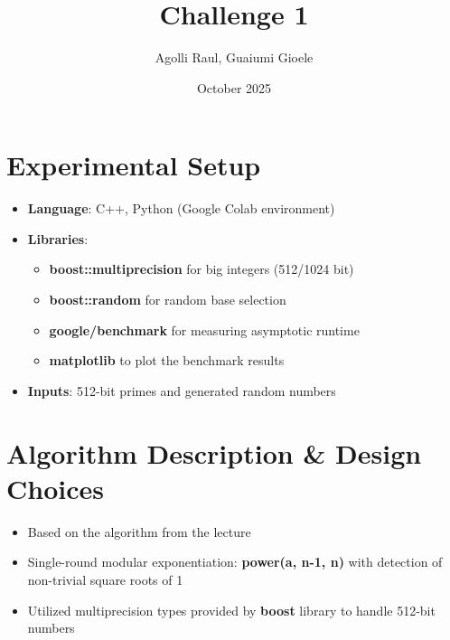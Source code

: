 \documentclass{article}
\title{Challenge 1}
\author{Agolli Raul, Guaiumi Gioele}
\date{October 2025}
\begin{document}
\maketitle

\section{Experimental Setup}

\begin{itemize}
    \item \textbf{Language}: C++, Python (Google Colab environment)
    \item \textbf{Libraries}:
        \begin{itemize}
            \item \textbf{boost::multiprecision} for big integers (512/1024 bit)
            \item \textbf{boost::random} for random base selection
            \item \textbf{google/benchmark} for measuring asymptotic runtime
            \item \textbf{matplotlib} to plot the benchmark results
        \end{itemize}
    \item \textbf{Inputs}: 512-bit primes and generated random numbers
\end{itemize}

\section{Algorithm Description \& Design Choices}
\begin{itemize}
    \item Based on the algorithm from the lecture
    \item Single-round modular exponentiation: \textbf{power(a, n-1, n)} with detection of non-trivial square roots of 1
    \item Utilized multiprecision types provided by \textbf{boost} library to handle 512-bit numbers
\end{itemize}
\end{document}
